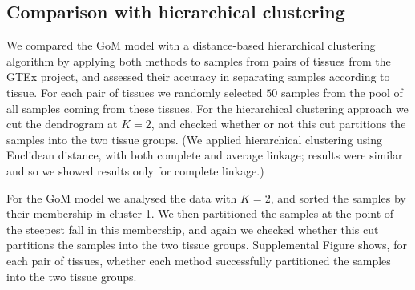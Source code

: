 \documentclass[10pt,letterpaper]{article}
\begin{document}
%


\subsection*{Comparison with hierarchical clustering}

We compared the GoM model with a distance-based hierarchical clustering algorithm by applying both methods to samples from
pairs of tissues from the GTEx project, and assessed their accuracy in
separating samples according to tissue.  For each pair of tissues  we randomly selected $50$ samples from the pool of all samples coming from these tissues.
For the hierarchical clustering approach we cut the dendrogram at $K=2$, and checked whether or not this cut partitions the samples into the two tissue groups.
(We applied hierarchical clustering using Euclidean distance, with both complete and average linkage; results were similar and so we showed results only for complete linkage.)

For the GoM model we analysed the data with $K=2$, and sorted the samples by their membership in cluster 1. We then partitioned the samples at the point of the steepest fall in this membership, and again we checked whether this cut partitions the samples into the two tissue groups. Supplemental Figure  shows, for each pair of tissues, whether each method successfully partitioned the samples into the two tissue groups.
\end{document}
